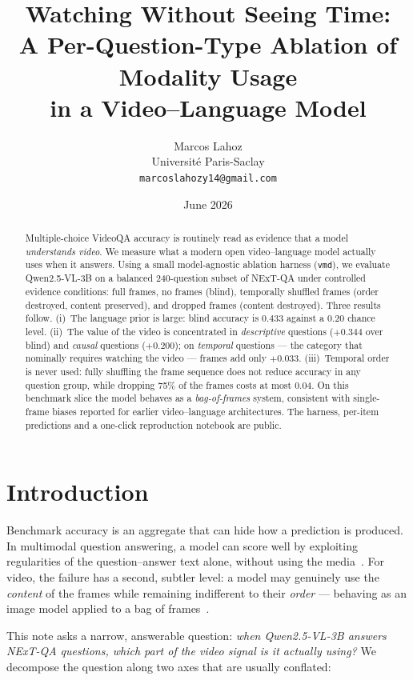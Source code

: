 \documentclass[11pt]{article}
\title{Watching Without Seeing Time:\\
A Per-Question-Type Ablation of Modality Usage\\ in a Video--Language Model}
\author{Marcos Lahoz\\
\small Universit\'e Paris-Saclay\\
\small \texttt{marcoslahozy14@gmail.com}}
\date{June 2026}
\begin{document}
\maketitle

\begin{abstract}
Multiple-choice VideoQA accuracy is routinely read as evidence that a model
\emph{understands video}. We measure what a modern open video--language model
actually uses when it answers. Using a small model-agnostic ablation harness
(\texttt{vmd}), we evaluate Qwen2.5-VL-3B on a balanced 240-question subset of
NExT-QA under controlled evidence conditions: full frames, no frames (blind),
temporally shuffled frames (order destroyed, content preserved), and dropped
frames (content destroyed). Three results follow. (i)~The language prior is
large: blind accuracy is $0.433$ against a $0.20$ chance level. (ii)~The value
of the video is concentrated in \emph{descriptive} questions ($+0.344$ over
blind) and \emph{causal} questions ($+0.200$); on \emph{temporal} questions ---
the category that nominally requires watching the video --- frames add only
$+0.033$. (iii)~Temporal order is never used: fully shuffling the frame
sequence does not reduce accuracy in any question group, while dropping 75\% of
the frames costs at most $0.04$. On this benchmark slice the model behaves as a
\emph{bag-of-frames} system, consistent with single-frame biases reported for
earlier video--language architectures. The harness, per-item predictions and a
one-click reproduction notebook are public.
\end{abstract}

\section{Introduction}

Benchmark accuracy is an aggregate that can hide how a prediction is produced.
In multimodal question answering, a model can score well by exploiting
regularities of the question--answer text alone, without using the
media~\citep{goyal2017vqa}. For video, the failure has a second, subtler level:
a model may genuinely use the \emph{content} of the frames while remaining
indifferent to their \emph{order} --- behaving as an image model applied to a
bag of frames~\citep{buch2022revisiting,lei2023revealing}.

This note asks a narrow, answerable question: \emph{when Qwen2.5-VL-3B answers
NExT-QA questions, which part of the video signal is it actually using?} We
decompose the question along two axes that are usually conflated:
\end{document}

